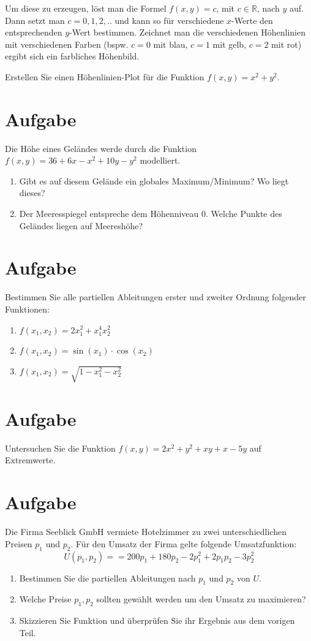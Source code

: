 \documentclass[fontsize=11pt, parskip=half]{scrartcl}
\newcommand{\R}{\mathbb{R}}
\begin{document}
Um diese zu erzeugen, löst man die Formel $f(x,y) = c$, mit $c \in \R$, nach $y$ auf. Dann setzt man $c = 0,1,2,..$ und kann so für verschiedene $x$-Werte den entsprechenden $y$-Wert bestimmen. Zeichnet man die verschiedenen Höhenlinien mit verschiedenen Farben (bspw. $c=0$ mit blau, $c=1$ mit gelb, $c= 2$ mit rot) ergibt sich ein farbliches Höhenbild.

Erstellen Sie einen Höhenlinien-Plot für die Funktion $f(x,y) = x^2 + y^2$.


\section{Aufgabe}
Die Höhe eines Geländes werde durch die Funktion $f(x,y) = 36 + 6x -x^2 + 10 y - y^2$ modelliert.
\begin{enumerate}[label=\alph*)]
    \item Gibt es auf diesem Gelände ein globales Maximum/Minimum? Wo liegt dieses?
    \item Der Meeresspiegel entspreche dem Höhenniveau $0$. Welche Punkte des Geländes liegen auf Meereshöhe?
\end{enumerate}


\section{Aufgabe}
Bestimmen Sie alle partiellen Ableitungen erster und zweiter Ordnung folgender Funktionen:
\begin{enumerate}[label=\alph*)]
    \item $f(x_1,x_2) = 2x_1^2+x_1^4x_2^2$
    \item $f(x_1,x_2) = \sin ( x_1)\cdot \cos (x_2)$
    \item $f(x_1,x_2) = \sqrt{1-x_1^2-x_2^2}$
\end{enumerate}

\section{Aufgabe}
Untersuchen Sie die Funktion $f(x,y)= 2x ^2 + y^2+xy+x-5y$ auf Extremwerte.

\section{Aufgabe}
Die Firma Seeblick GmbH vermiete Hotelzimmer zu zwei unterschiedlichen Preisen $p_1$ und $p_2$. Für den Umsatz
der Firma gelte folgende Umsatzfunktion:
\[U(p_1,p_2) = = 200p_1 +180p_2 -2p^2_1 +2p_1 p_2 -3p^2_2
    \]
\begin{enumerate}[label=\alph*)]
    \item Bestimmen Sie die partiellen Ableitungen nach $p_1$ und $p_2$ von $U$.
    \item Welche Preise $p_1,p_2$ sollten gewählt werden um den Umsatz zu maximieren?
    \item Skizzieren Sie Funktion und überprüfen Sie ihr Ergebnis aus dem vorigen Teil.
\end{enumerate}    
\end{document}
